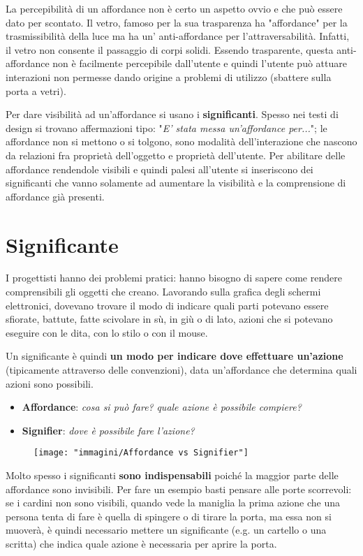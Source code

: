 La percepibilità di un affordance non è certo un aspetto ovvio e che può essere dato per scontato. Il vetro, famoso per la sua trasparenza ha
"affordance" per la trasmissibilità della luce ma ha un' anti-affordance per l'attraversabilità. Infatti, il vetro non consente il passaggio di corpi
solidi. Essendo trasparente, questa anti-affordance non è facilmente percepibile dall'utente e quindi l'utente può attuare interazioni non permesse
dando origine a problemi di utilizzo (sbattere sulla porta a vetri).

Per dare visibilità ad un'affordance si usano i \textbf{significanti}.
Spesso nei testi di design si trovano affermazioni tipo: "\textit{E' stata messa un'affordance per...}"; le affordance non si mettono o si tolgono, sono
modalità dell'interazione che nascono da relazioni fra proprietà dell'oggetto e proprietà dell'utente. Per abilitare delle affordance
rendendole visibili e quindi palesi all'utente si inseriscono dei significanti che vanno solamente ad aumentare la visibilità e la comprensione di
affordance già presenti.

\section{Significante}
I progettisti hanno dei problemi pratici: hanno bisogno di sapere come rendere comprensibili gli oggetti che creano. Lavorando sulla grafica degli
schermi elettronici, dovevano trovare il modo di indicare quali parti potevano essere sfiorate, battute, fatte scivolare in sù, in giù o di lato,
azioni che si potevano eseguire con le dita, con lo stilo o con il mouse.

Un significante è quindi \textbf{un modo per indicare dove effettuare un'azione} (tipicamente attraverso delle convenzioni), data un'affordance che
determina quali azioni sono possibili.

\begin{itemize}
	\itemsep-0.3em
	\item \textbf{Affordance}: \textit{cosa si può fare?} \textit{quale azione è possibile compiere?}
	\item \textbf{Signifier}: \textit{dove è possibile fare l'azione?}
\end{itemize}

\begin{figure}[!ht]
	\centering
	\texttt{[image: "immagini/Affordance vs Signifier"]}
\end{figure}

Molto spesso i significanti \textbf{sono indispensabili} poiché la maggior parte delle affordance sono invisibili. Per fare un esempio basti pensare
alle porte scorrevoli: se i cardini non sono visibili, quando vede la maniglia la prima azione che una persona tenta di fare è quella di spingere o di
tirare la porta, ma essa non si muoverà, è quindi necessario mettere un significante (e.g. un cartello o una scritta) che indica quale azione è necessaria
per aprire la porta.

